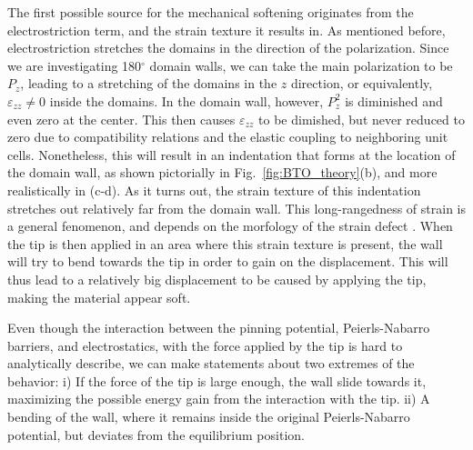 The first possible source for the mechanical softening originates from the electrostriction term, and the strain texture it results in. As mentioned before, electrostriction stretches the domains in the direction of the polarization. Since we are investigating 180$^\circ$ domain walls, we can take the main polarization to be $P_z$, leading to a stretching of the domains in the $z$ direction, or equivalently, $\varepsilon_{zz} \neq 0$ inside the domains. In the domain wall, however, $P_z^2$ is diminished and even zero at the center. This then causes $\varepsilon_{zz}$ to be dimished, but never reduced to zero due to compatibility relations and the elastic coupling to neighboring unit cells. Nonetheless, this will result in an indentation that forms at the location of the domain wall, as shown pictorially in Fig.~\ref{fig:BTO_theory}(b), and more realistically in (c-d). As it turns out, the strain texture of this indentation stretches out relatively far  from the domain wall. This long-rangedness of strain is a general fenomenon, and depends on the morfology of the strain defect . When the tip is then applied in an area where this strain texture is present, the wall will try to bend towards the tip in order to gain on the displacement. This will thus lead to a relatively big displacement to be caused by applying the tip, making the material appear soft.

Even though the interaction between the pinning potential, Peierls-Nabarro barriers, and electrostatics, with the force applied by the tip is hard to analytically describe, we can make statements about two extremes of the behavior: i) If the force of the tip is large enough, the wall slide towards it, maximizing the possible energy gain from the interaction with the tip.  ii) A bending of the wall, where it remains inside the original Peierls-Nabarro potential, but deviates from  the equilibrium position. 

